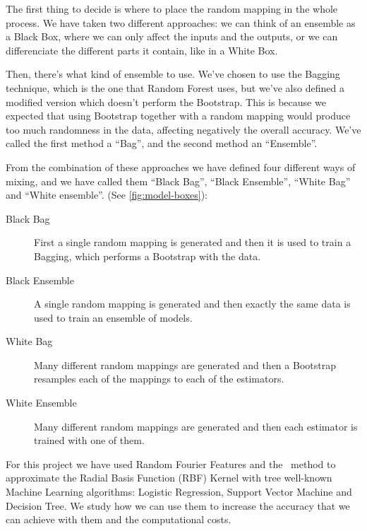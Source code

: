 \begin{pre-delivery}
  The first thing to decide is where to place the random mapping in the whole
  process. We have taken two different approaches: we can think of an
  ensemble as a Black Box, where we can only affect the inputs and the outputs,
  or we can differenciate the different parts it contain, like in a White Box.

  Then, there's what kind of ensemble to use. We've chosen to use the
  Bagging technique, which is the one that Random Forest uses, but we've
  also defined a modified version which doesn't perform the Bootstrap. This is
  because we expected that using Bootstrap together with a random mapping would
  produce too much randomness in the data, affecting negatively the
  overall accuracy. We've called the first method a ``Bag'', and the second
  method an ``Ensemble''.

  From the combination of these approaches we have defined four different
  ways of mixing, and we have called them
  ``Black Bag'', ``Black Ensemble'', ``White Bag'' and ``White ensemble''.
  (See \ref{fig:model-boxes}):

  \begin{description}
    \item[Black Bag] First a single random mapping is generated and then it
    is used to train a Bagging, which performs a Bootstrap with the data.
    \item[Black Ensemble] A single random mapping is generated and then exactly
    the same data is used to train an ensemble of models.
    \item[White Bag] Many different random mappings are generated and then a
    Bootstrap resamples each of the mappings to each of the estimators.
    \item[White Ensemble] Many different random mappings are generated and then
    each estimator is trained with one of them.
  \end{description}

  For this project we have used Random Fourier Features and the \Nys\
  method to approximate the Radial Basis Function (RBF) Kernel with tree
  well-known Machine Learning algorithms: Logistic Regression, Support Vector
  Machine and Decision Tree. We study how we can use them to increase
  the accuracy that we can achieve with them and the computational costs.


\end{pre-delivery}
